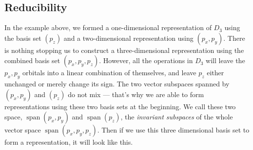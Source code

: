 \documentclass{article}
\theoremstyle{plain}\theoremheaderfont{\normalfont\itshape}\theorembodyfont{\rmfamily}\theoremseparator{.}\newtheorem*{rem}{Remark}\newtheorem*{ex}{Example}\newtheorem*{proof}{Proof}\newtheorem*{altp}{Alternative proof}
\theoremstyle{plain}\theoremheaderfont{\normalfont\bfseries}\theorembodyfont{\rmfamily}\theoremseparator{.}\newtheorem{thm}{Theorem}[section]\newtheorem{lem}[thm]{Lemma}\newtheorem{prop}[thm]{Proposition}\newtheorem*{cor}{Corollary}\newtheorem{defn}[thm]{Definition}\newtheorem{clm}[thm]{Claim}\newtheorem{clminproof}{Claim}\newtheorem*{law}{Law}\newtheorem{pos}[thm]{Postulate}
\theoremstyle{break}\theoremheaderfont{\normalfont\itshape}\theorembodyfont{\rmfamily}\theoremseparator{.\medskip}\newtheorem*{proofskip}{Proof}\newtheorem*{exs}{Examples}\newtheorem*{rems}{Remarks}
\theoremstyle{break}\theoremheaderfont{\normalfont\bfseries}\theorembodyfont{\rmfamily}\theoremseparator{.\medskip}\newtheorem{lemskip}[thm]{Lemma}\newtheorem{defnskip}[thm]{Definition}\newtheorem{propskip}[thm]{Proposition}\newtheorem{thmskip}[thm]{Theorem}
\numberwithin{equation}{section}
\DeclareMathOperator{\spn}{span}
\begin{document}
    \subsection{Reducibility}
    In the example above, we formed a one-dimensional representation of \(D_3\) using the basis set \((p_z)\) and a two-dimensional representation using \((p_x,p_y)\). There is nothing stopping us to construct a three-dimensional representation using the combined basis set \((p_x,p_y,p_z)\). However, all the operations in \(D_3\) will leave the \(p_x,p_y\) orbitals into a linear combination of themselves, and leave \(p_z\) either unchanged or merely change its sign. The two vector subspaces spanned by \((p_x,p_y)\) and \((p_z)\) do not mix --- that's why we are able to form representations using these two basis sets at the beginning. We call these two space, \(\spn(p_x,p_y)\) and \(\spn(p_z)\), the \textit{invariant subspaces} of the whole vector space \(\spn(p_x,p_y,p_z)\). Then if we use this three dimensional basis set to form a representation, it will look like this.
\end{document}
